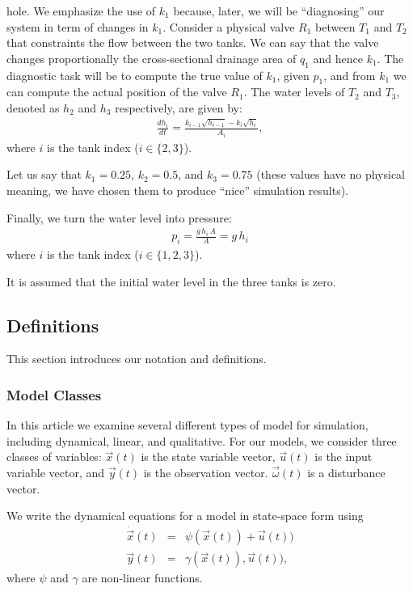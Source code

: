 hole. We emphasize the use of $k_1$ because, later, we will be
``diagnosing'' our system in term of changes in $k_1$. Consider a
physical valve $R_1$ between $T_1$ and $T_2$ that constraints the flow
between the two tanks. We can say that the valve changes
proportionally the cross-sectional drainage area of $q_1$ and hence
$k_1$. The diagnostic task will be to compute the true value of $k_1$,
given $p_1$, and from $k_1$ we can compute the actual position of the
valve $R_1$.
%
The water levels of $T_2$ and $T_3$, denoted as $h_2$ and $h_3$
respectively, are given by:
%
\begin{eqnarray}\label{eq:tank1}
%
\frac{d h_i}{dt} = \frac{k_{i - 1} \sqrt{h_{i - 1}} - k_i \sqrt{h_i}}{A_i},
%
\end{eqnarray}
%
where $i$ is the tank index ($i \in \{2, 3\}$).
\par
Let us say that $k_1 = 0.25$, $k_2 = 0.5$, and $k_3 = 0.75$ (these
values have no physical meaning, we have chosen them to produce
``nice'' simulation results).
\par
Finally, we turn the water level into pressure:
\begin{eqnarray}
p_i = \frac{g\,h_i\,A}{A} = g\,h_i
\end{eqnarray}
where $i$ is the tank index ($i \in \{1, 2, 3\}$).
\par
It is assumed that the initial water level in the three tanks is zero.
%
\subsection{Definitions}

This section introduces our notation and definitions.

\subsubsection{Model Classes}

In this article we examine several different  types of model for simulation, including dynamical, linear, and qualitative.
For our models, we consider three classes of variables:
$\vec{x}(t)$ is the state variable vector, $\vec{u}(t)$ is the input variable vector, and $\vec{y}(t)$ is the observation vector.
$\vec{\omega}(t)$ is a disturbance vector.

\begin{definition}
We write the dynamical equations for a model in state-space form using
\begin{eqnarray}\label{dyn-model}
\dot{\vec{x}}(t) & = & \psi (\vec{x}(t)) + \vec{u}(t))\\
\vec{y}(t) & = & \gamma (\vec{x}(t)), \vec{u}(t)),
\end{eqnarray}
where $\psi$ and $\gamma$ are non-linear functions.
\end{definition}

